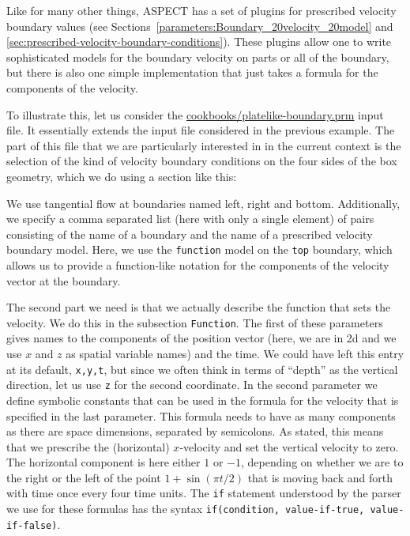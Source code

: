 \documentclass{article}
\newcommand{\aspect}{\textsc{ASPECT}}
\begin{document}
Like for many other things, \aspect{} has a set of plugins for prescribed
velocity boundary values (see
Sections~\ref{parameters:Boundary_20velocity_20model} and
\ref{sec:prescribed-velocity-boundary-conditions}). These plugins allow one to
write sophisticated models for the boundary velocity on parts or all of the
boundary, but there is also one simple implementation that just takes a formula
for the components of the velocity.

To illustrate this, let us consider the \url{cookbooks/platelike-boundary.prm}
input file. It essentially extends the input file considered in the previous example.
The part of this file that we are particularly interested in in the current
context is the selection of the kind of velocity boundary conditions on the four
sides of the box geometry, which we do using a section like this:


We use tangential flow at boundaries named left, right and bottom.
Additionally, we specify a comma separated list (here with only a single
element) of pairs consisting of the name of a boundary and the name of a
prescribed velocity boundary model. Here, we use the \texttt{function} model on
the \texttt{top} boundary, which allows us to provide a function-like notation
for the components of the velocity vector at the boundary.

The second part we need is that we actually describe the function that sets the
velocity. We do this in the subsection \texttt{Function}. The first of these
parameters gives names to the components of the position vector (here, we are
in 2d and we use $x$ and $z$ as spatial variable names) and the time. We could
have left this entry at its default, \texttt{x,y,t}, but since we
often think in terms of ``depth'' as the vertical direction, let us use
\texttt{z} for the second coordinate.
In the second parameter we define symbolic constants that can be used
in the formula for the velocity that is specified in the last parameter. This
formula needs to have as many components as there are space dimensions,
separated by semicolons. As stated, this means that we prescribe the
(horizontal) $x$-velocity and set the vertical velocity to zero. The horizontal
component is here either $1$ or $-1$, depending on whether we are to the right
or the left of the point $1+\sin(\pi t/2)$ that is moving back and forth with
time once every four time units. The \texttt{if} statement understood by the
parser we use for these formulas has the syntax
\texttt{if(condition, value-if-true, value-if-false)}.
\end{document}
